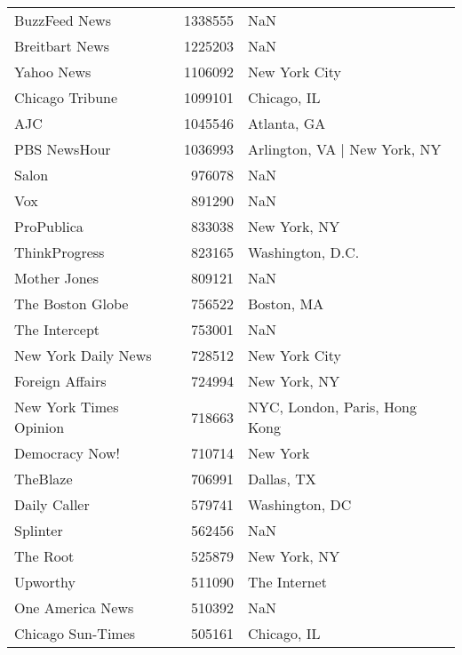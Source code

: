 \begin{longtable}{lrl}
	BuzzFeed News &    1338555 &                                   NaN \\
	Breitbart News &    1225203 &                                   NaN \\
	Yahoo News &    1106092 &                         New York City \\
	Chicago Tribune &    1099101 &                           Chicago, IL \\
	AJC &    1045546 &                           Atlanta, GA \\
	PBS NewsHour &    1036993 &          Arlington, VA | New York, NY \\
	Salon &     976078 &                                   NaN \\
	Vox &     891290 &                                   NaN \\
	ProPublica &     833038 &                          New York, NY \\
	ThinkProgress &     823165 &                      Washington, D.C. \\
	Mother Jones &     809121 &                                   NaN \\
	The Boston Globe &     756522 &                            Boston, MA \\
	The Intercept &     753001 &                                   NaN \\
	New York Daily News &     728512 &  New York City \\
	Foreign Affairs &     724994 &                          New York, NY \\
	New York Times Opinion &     718663 &         NYC, London, Paris, Hong Kong \\
	Democracy Now! &     710714 &                              New York \\
	TheBlaze &     706991 &                            Dallas, TX \\
	Daily Caller &     579741 &                        Washington, DC \\
	Splinter &     562456 &                                   NaN \\
	The Root &     525879 &                          New York, NY \\
	Upworthy &     511090 &                          The Internet \\
	One America News &     510392 &                                   NaN \\
	Chicago Sun-Times &     505161 &                           Chicago, IL \\

\end{longtable}
